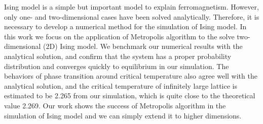 Ising model is a simple but important model to explain ferromagnetism. 
However, only one- and two-dimensional cases have been solved analytically. 
Therefore, it is necessary to develop a numerical method for the simulation of Ising model. 
In this work we focus on the application of Metropolis algorithm to the solve two-dimensional (2D) Ising model. 
We benchmark our numerical results with the analytical solution, 
and confirm that the system has a proper probability distribution and converges quickly to equilibrium in our simulation. 
The behaviors of phase transition around critical temperature also agree well with the analytical solution, 
and the critical temperature of infinitely large lattice is estimated to be 2.265 from our simulation, 
which is quite close to the theoretical value 2.269. 
Our work shows the success of Metropolis algorithm in the simulation of Ising model and 
we can simply extend it to higher dimensions.  
